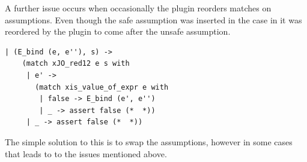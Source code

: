 \documentclass[12pt,twoside,notitlepage]{report}
\begin{document}
A further issue occurs when occasionally the plugin reorders matches on assumptions. Even though the safe assumption was inserted in the case in  it was reordered by the plugin to come after the unsafe assumption. 
\begin{minipage}{\linewidth}

\begin{lstlisting}[caption={OCaml swapped assumptions}, label={lst:ocamlswapassume}]
  | (E_bind (e, e''), s) ->
    (match xJO_red12 e s with
     | e' ->
       (match xis_value_of_expr e with
        | false -> E_bind (e', e'')
        | _ -> assert false (*  *))
     | _ -> assert false (*  *))
\end{lstlisting}

\end{minipage}
The simple solution to this is to swap the assumptions, however in some cases that leads to to the issues mentioned above.
\end{document}
